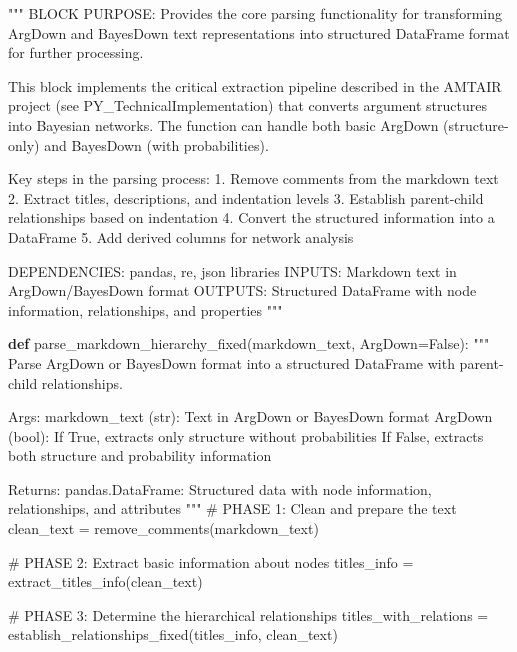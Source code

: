 \documentclass[
  11pt,
  letterpaper,
]{book}
\newenvironment{Shaded}{\begin{snugshade}}{\end{snugshade}}
\newcommand{\CommentTok}[1]{\textcolor[rgb]{0.37,0.37,0.37}{#1}}
\newcommand{\KeywordTok}[1]{\textcolor[rgb]{0.00,0.23,0.31}{\textbf{#1}}}
\newcommand{\NormalTok}[1]{\textcolor[rgb]{0.00,0.23,0.31}{#1}}
\newcommand{\OperatorTok}[1]{\textcolor[rgb]{0.37,0.37,0.37}{#1}}
\newcommand{\VariableTok}[1]{\textcolor[rgb]{0.07,0.07,0.07}{#1}}
\begin{document}
\begin{landscape}
\begin{Shaded}
\begin{Highlighting}[]
\CommentTok{"""}
\CommentTok{BLOCK PURPOSE: Provides the core parsing functionality for transforming ArgDown}
\CommentTok{and BayesDown text representations into structured DataFrame format for further}
\CommentTok{processing.}

\CommentTok{This block implements the critical extraction pipeline described in the AMTAIR}
\CommentTok{project (see PY\_TechnicalImplementation) that converts argument structures}
\CommentTok{into Bayesian networks.}
\CommentTok{The function can handle both basic ArgDown (structure{-}only) and}
\CommentTok{BayesDown (with probabilities).}

\CommentTok{Key steps in the parsing process:}
\CommentTok{1. Remove comments from the markdown text}
\CommentTok{2. Extract titles, descriptions, and indentation levels}
\CommentTok{3. Establish parent{-}child relationships based on indentation}
\CommentTok{4. Convert the structured information into a DataFrame}
\CommentTok{5. Add derived columns for network analysis}

\CommentTok{DEPENDENCIES: pandas, re, json libraries}
\CommentTok{INPUTS: Markdown text in ArgDown/BayesDown format}
\CommentTok{OUTPUTS: Structured DataFrame with node information, relationships, and properties}
\CommentTok{"""}

\KeywordTok{def}\NormalTok{ parse\_markdown\_hierarchy\_fixed(markdown\_text, ArgDown}\OperatorTok{=}\VariableTok{False}\NormalTok{):}
    \CommentTok{"""}
\CommentTok{    Parse ArgDown or BayesDown format into a structured DataFrame with parent{-}child relationships.}

\CommentTok{    Args:}
\CommentTok{        markdown\_text (str): Text in ArgDown or BayesDown format}
\CommentTok{        ArgDown (bool): If True, extracts only structure without probabilities}
\CommentTok{                        If False, extracts both structure and probability information}

\CommentTok{    Returns:}
\CommentTok{        pandas.DataFrame: Structured data with node information, relationships, and attributes}
\CommentTok{    """}
    \CommentTok{\# PHASE 1: Clean and prepare the text}
\NormalTok{    clean\_text }\OperatorTok{=}\NormalTok{ remove\_comments(markdown\_text)}

    \CommentTok{\# PHASE 2: Extract basic information about nodes}
\NormalTok{    titles\_info }\OperatorTok{=}\NormalTok{ extract\_titles\_info(clean\_text)}

    \CommentTok{\# PHASE 3: Determine the hierarchical relationships}
\NormalTok{    titles\_with\_relations }\OperatorTok{=}\NormalTok{ establish\_relationships\_fixed(titles\_info, clean\_text)}


\end{Highlighting}
\end{Shaded}
\end{landscape}
\end{document}

